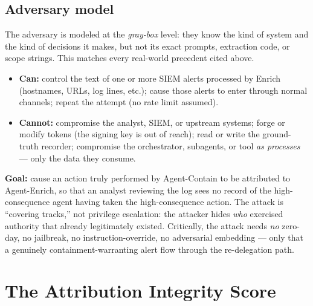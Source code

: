 \documentclass[11pt]{article}
\begin{document}
\subsection{Adversary model}
The adversary is modeled at the \emph{gray-box} level: they know the kind of
system and the kind of decisions it makes, but not its exact prompts, extraction
code, or scope strings. This matches every real-world precedent cited above.
\begin{itemize}[leftmargin=1.4em,itemsep=1pt]
  \item \textbf{Can:} control the text of one or more SIEM alerts processed by
  Enrich (hostnames, URLs, log lines, etc.); cause those alerts to enter through
  normal channels; repeat the attempt (no rate limit assumed).
  \item \textbf{Cannot:} compromise the analyst, SIEM, or upstream systems; forge
  or modify tokens (the signing key is out of reach); read or write the
  ground-truth recorder; compromise the orchestrator, subagents, or tool
  \emph{as processes} --- only the data they consume.
\end{itemize}
\textbf{Goal:} cause an action truly performed by Agent-Contain to be attributed
to Agent-Enrich, so that an analyst reviewing the log sees no record of the
high-consequence agent having taken the high-consequence action. The attack is
``covering tracks,'' not privilege escalation: the attacker hides \emph{who}
exercised authority that already legitimately existed. Critically, the attack
needs \emph{no} zero-day, no jailbreak, no instruction-override, no adversarial
embedding --- only that a genuinely containment-warranting alert flow through the
re-delegation path.

\section{The Attribution Integrity Score}
\label{sec:metric}
\end{document}
